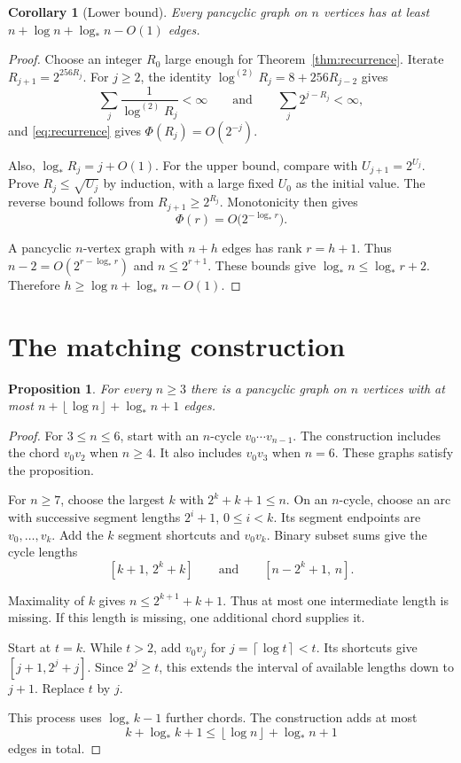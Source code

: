 \documentclass[11pt,a4paper]{article}
\numberwithin{equation}{section}
\newtheorem{proposition}[theorem]{Proposition}
\newtheorem{corollary}[theorem]{Corollary}
\theoremstyle{definition}
\theoremstyle{remark}
\newcommand{\lstar}{\log_*}
\newcommand{\ceil}[1]{\left\lceil#1\right\rceil}
\newcommand{\floor}[1]{\left\lfloor#1\right\rfloor}
\begin{document}
\begin{corollary}[Lower bound]\label{cor:lower}
Every pancyclic graph on $n$ vertices has at least $n+\log n+\lstar n-O(1)$ edges.
\end{corollary}

\begin{proof}
Choose an integer $R_0$ large enough for Theorem~\ref{thm:recurrence}. Iterate $R_{j+1}=2^{256R_j}$. For $j\ge2$, the identity $\log^{(2)}R_j=8+256R_{j-2}$ gives
\[
 \sum_j\frac1{\log^{(2)}R_j}<\infty\qquad\text{and}\qquad\sum_j2^{j-R_j}<\infty,
\]
and \eqref{eq:recurrence} gives $\Phi(R_j)=O(2^{-j})$.

Also, $\lstar R_j=j+O(1)$. For the upper bound, compare with $U_{j+1}=2^{U_j}$. Prove $R_j\le\sqrt{U_j}$ by induction, with a large fixed $U_0$ as the initial value. The reverse bound follows from $R_{j+1}\ge2^{R_j}$. Monotonicity then gives
\[
 \Phi(r)=O\bigl(2^{-\lstar r}\bigr).
\]

A pancyclic $n$-vertex graph with $n+h$ edges has rank $r=h+1$. Thus $n-2=O(2^{r-\lstar r})$ and $n\le2^{r+1}$. These bounds give $\lstar n\le\lstar r+2$. Therefore $h\ge\log n+\lstar n-O(1)$.
\end{proof}

\section{The matching construction}\label{sec:upper}
\begin{proposition}\label{prop:upper}
For every $n\ge3$ there is a pancyclic graph on $n$ vertices with at most $n+\floor{\log n}+\lstar n+1$ edges.
\end{proposition}

\begin{proof}
For $3\le n\le6$, start with an $n$-cycle $v_0\cdots v_{n-1}$. The construction includes the chord $v_0v_2$ when $n\ge4$. It also includes $v_0v_3$ when $n=6$. These graphs satisfy the proposition.

For $n\ge7$, choose the largest $k$ with $2^k+k+1\le n$. On an $n$-cycle, choose an arc with successive segment lengths $2^i+1$, $0\le i<k$. Its segment endpoints are $v_0,\ldots,v_k$. Add the $k$ segment shortcuts and $v_0v_k$. Binary subset sums give the cycle lengths
\[
 [k+1,\,2^k+k]\qquad\text{and}\qquad[n-2^k+1,\,n].
\]

Maximality of $k$ gives $n\le2^{k+1}+k+1$. Thus at most one intermediate length is missing. If this length is missing, one additional chord supplies it.

Start at $t=k$. While $t>2$, add $v_0v_j$ for $j=\ceil{\log t}<t$. Its shortcuts give $[j+1,2^j+j]$. Since $2^j\ge t$, this extends the interval of available lengths down to $j+1$. Replace $t$ by $j$.

This process uses $\lstar k-1$ further chords. The construction adds at most
\[
 k+\lstar k+1\le\floor{\log n}+\lstar n+1
\]
edges in total.
\end{proof}
\end{document}
